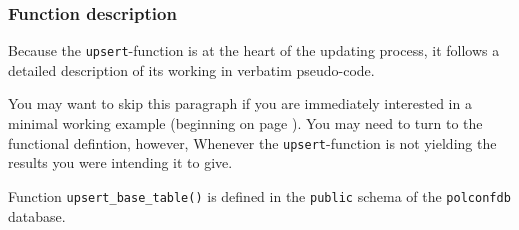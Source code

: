 \subsubsection{Function description}

Because the \texttt{upsert}-function is at the heart of the updating process, it follows a detailed description of its working in verbatim pseudo-code.

You may want to skip this paragraph if you are immediately interested in a minimal working example (beginning on page \pageref{par_upsert_minimal_working_example}). 
You may need to turn to the functional defintion, however, Whenever the \texttt{upsert}-function is not yielding the results you were intending it to give.

Function \texttt{upsert\_base\_table()} is defined in the \texttt{public} schema of the \texttt{polconfdb} database.%
